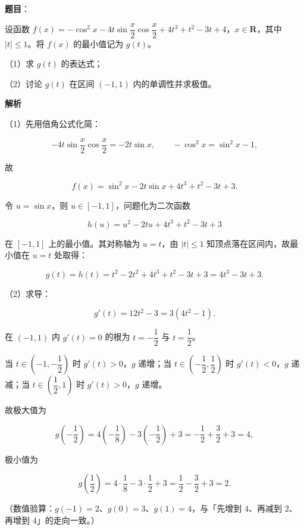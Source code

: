 \begin{answer}

\textbf{题目}：

设函数 $f(x)=-\cos^2x-4t\sin\dfrac x2\cos\dfrac x2+4t^3+t^2-3t+4$，$x\in\mathbf R$，其中 $|t|\leqslant1$。将 $f(x)$ 的最小值记为 $g(t)$。

（1）求 $g(t)$ 的表达式；

（2）讨论 $g(t)$ 在区间 $(-1,1)$ 内的单调性并求极值。

\textbf{解析}

（1）先用倍角公式化简：

\nopagebreak[4]
\[-4t\sin\frac x2\cos\frac x2=-2t\sin x,\qquad -\cos^2x=\sin^2x-1,\]

故

\nopagebreak[4]
\[f(x)=\sin^2x-2t\sin x+4t^3+t^2-3t+3.\]

令 $u=\sin x$，则 $u\in[-1,1]$，问题化为二次函数

\nopagebreak[4]
\[h(u)=u^2-2tu+4t^3+t^2-3t+3\]

在 $[-1,1]$ 上的最小值。其对称轴为 $u=t$，由 $|t|\leqslant1$ 知顶点落在区间内，故最小值在 $u=t$ 处取得：

\nopagebreak[4]
\[g(t)=h(t)=t^2-2t^2+4t^3+t^2-3t+3=4t^3-3t+3.\]

（2）求导：

\nopagebreak[4]
\[g'(t)=12t^2-3=3(4t^2-1).\]

在 $(-1,1)$ 内 $g'(t)=0$ 的根为 $t=-\dfrac12$ 与 $t=\dfrac12$。

当 $t\in\left(-1,-\dfrac12\right)$ 时 $g'(t)>0$，$g$ 递增；当 $t\in\left(-\dfrac12,\dfrac12\right)$ 时 $g'(t)<0$，$g$ 递减；当 $t\in\left(\dfrac12,1\right)$ 时 $g'(t)>0$，$g$ 递增。

故极大值为

\nopagebreak[4]
\[g\left(-\frac12\right)=4\left(-\frac18\right)-3\left(-\frac12\right)+3=-\frac12+\frac32+3=4,\]

极小值为

\nopagebreak[4]
\[g\left(\frac12\right)=4\cdot\frac18-3\cdot\frac12+3=\frac12-\frac32+3=2.\]

（数值验算：$g(-1)=2$、$g(0)=3$、$g(1)=4$，与「先增到 $4$、再减到 $2$、再增到 $4$」的走向一致。）


\end{answer}
